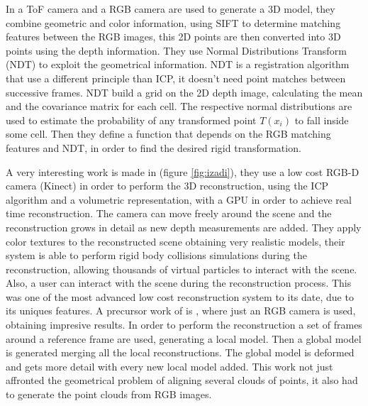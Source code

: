 In \cite{huhle} a ToF camera and a RGB camera are used to generate a 3D model, they combine geometric and color information, 
using SIFT to determine matching features between the RGB images, 
this 2D points are then converted into 3D points using the depth information. They use  Normal Distributions Transform (NDT) \cite{biber03} to exploit the geometrical 
information. NDT is a registration algorithm that use a different principle than ICP, it doesn't need point matches 
between successive frames. NDT build a grid on the 2D depth image, calculating the mean and the covariance matrix for each 
 cell. The respective normal distributions are used to estimate the probability of any transformed point $T(x_i)$ to fall 
inside some cell. Then they define a function that depends on the RGB matching features and NDT, in order to find the desired 
rigid transformation.

 
A very interesting work is made in \cite{izadi}(figure \ref{fig:izadi}), they use a low cost RGB-D camera (Kinect) in order to perform
the 3D reconstruction, using the ICP algorithm  and a volumetric representation, with a GPU in order to 
achieve real time reconstruction. The camera can move freely around the scene and the reconstruction grows in detail 
as new depth measurements are added. They apply color textures to the reconstructed scene obtaining very 
realistic models, their system is able to perform rigid body collisions 
simulations during the reconstruction, allowing thousands of virtual particles to interact with the scene. Also, a 
user can interact with the scene during the reconstruction process. This was one of the most advanced low cost 
reconstruction system to its date, due to its uniques features. A precursor work of \cite{izadi} is \cite{Newcombe10livedense}, where 
 just an RGB camera is used, obtaining impresive results. In order to perform the reconstruction a set of frames around 
a reference frame are used, generating a local model. Then a global model is generated merging all the local reconstructions.
The global model is deformed and gets more detail with every new local model added. This work not just affronted 
the geometrical problem of aligning several clouds of points, it also had to generate the point clouds from RGB images.


